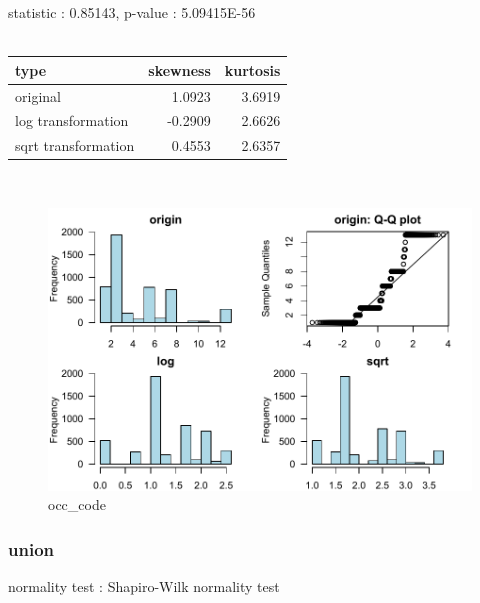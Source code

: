 \documentclass{book}\usepackage[]{graphicx}\usepackage[]{color}
\begin{document}
\noindent statistic : 0.85143,  p-value : 5.09415E-56\\
\\%
\begin{tabular}{lrr}
  \toprule
type & skewness & kurtosis \\ 
  \midrule
original & 1.0923 & 3.6919 \\ 
  log transformation & -0.2909 & 2.6626 \\ 
  sqrt transformation & 0.4553 & 2.6357 \\ 
   \bottomrule
\end{tabular}
\\
\begin{figure}[!ht]
\centering
\includegraphics[width=1.0\textwidth]{figure/norm14.pdf}
\caption{occ\_code}
\end{figure}
\clearpage
\subsubsection{ union }

normality test : Shapiro-Wilk normality test
\end{document}
